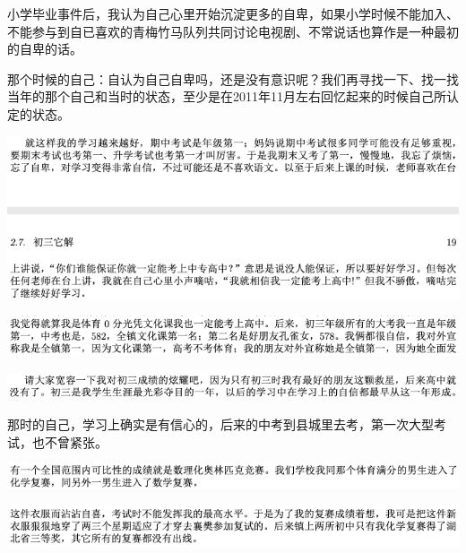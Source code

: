 \documentclass[9pt, b5paper]{article}
\begin{document}
小学毕业事件后，我认为自己心里开始沉淀更多的自卑，如果小学时候不能加入、不能参与到自已喜欢的青梅竹马队列共同讨论电视剧、不常说话也算作是一种最初的自卑的话。

那个时候的自己：自认为自己自卑吗，还是没有意识呢？我们再寻找一下、找一找当年的那个自己和当时的状态，至少是在2011年11月左右回忆起来的时候自己所认定的状态。

\begin{center}
\includegraphics[width=.9\linewidth]{./pic/backups_plans_20210422_101921.png}
\end{center}

\begin{center}
\includegraphics[width=.9\linewidth]{./pic/backups_plans_20210422_102045.png}
\end{center}

\begin{center}
\includegraphics[width=.9\linewidth]{./pic/backups_plans_20210422_102136.png}
\end{center}

那时的自己，学习上确实是有信心的，后来的中考到县城里去考，第一次大型考试，也不曾紧张。 

\begin{center}
\includegraphics[width=.9\linewidth]{./pic/backups_plans_20210422_102214.png}
\end{center}

\begin{center}
\includegraphics[width=.9\linewidth]{./pic/backups_plans_20210422_102229.png}
\end{center}
\end{document}
